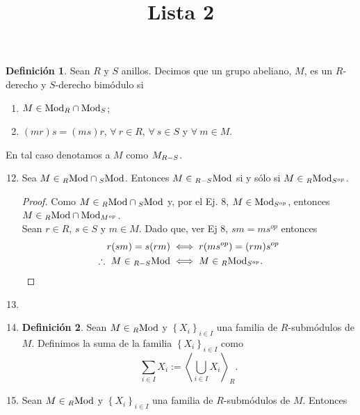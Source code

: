 \documentclass{article}
\title{Lista 2}
\author{}
\date{}
\newcommand{\arbtfam}[3]{
	{\left\{{#1}_{#2}\right\}}_{#2\in #3}
}
\newcommand{\gengroup}[1]{
	\left< #1\right>
}
\newcommand{\opst}[1]{
	{#1}^{op}
}
\newcommand{\ringmod}[3]{
	\if#3l
	{}_{#1}#2
	\else
	\if#3r
	#2_{#1}
	\fi
	\fi
}
\newcommand{\ringbimod}[4]{
	\if#4l
	{}_{#1-#2}#3
	\else
	\if#4r
	#3_{#1-#2}
	\else 
	\ifstrequal{#4}{lr}{
		{}_{#1}#3_{#2}
	}
	\fi
	\fi
}
\theoremstyle{definition}
\newtheorem{define}{Definición}
\theoremstyle{plain}
\theoremstyle{plain}
\theoremstyle{definition}
\theoremstyle{definition}
\theoremstyle{definition}
\theoremstyle{definition}
\theoremstyle{definition}
\theoremstyle{definition}
\begin{document}
	
	\maketitle
\begin{define}
	Sean $R$ y $S$ anillos. Decimos que un grupo abeliano, $M$, es un $R$-derecho y $S$-derecho bimódulo si
	\begin{enumerate}[label=\roman*)]
		\item $M\in\ringmod{R}{\text{Mod}}{r}\cap\ringmod{S}{\text{Mod}}{r}$;
		\item $(mr)s=(ms)r$, $\forall\ r\in R$, $\forall\ s\in S$ y $\forall\ m\in M$.
	\end{enumerate}
	En tal caso denotamos a $M$ como $\ringbimod{R}{S}{M}{r}$.
\end{define}
	\begin{enumerate}
		\setcounter{enumi}{11}
\item Sea $M\in\ringmod{R}{\text{Mod}}{l}\cap\ringmod{S}{\text{Mod}}{l}$. Entonces $M\in\ringbimod{R}{S}{\text{Mod}}{l}$ si y sólo si $M\in\ringbimod{R}{\opst{S}}{\text{Mod}}{lr}$.
\begin{proof}
	Como $M\in\ringmod{R}{\text{Mod}}{l}\cap\ringmod{S}{\text{Mod}}{l}$ y, por el Ej. 8, $M\in\ringmod{\opst{S}}{\text{Mod}}{r}$, entonces $M\in\ringmod{R}{\text{Mod}}{l}\cap\ringmod{\opst{M}}{\text{Mod}}{r}$.\\ Sean $r\in R$, $s\in S$ y $m\in M$. 
	Dado que, ver Ej 8, $sm=ms^{op}$ entonces 
	\begin{align*}
		r(sm)=s(rm)&\iff r(m\opst{s})=(rm)\opst{s}\\
		\therefore\  M\in\ringbimod{R}{S}{\text{Mod}}{l}&\iff M\in\ringbimod{R}{\opst{S}}{\text{Mod}}{lr}.
	\end{align*}
\end{proof}
\item\item
\begin{define}
	Sean $M\in\ringmod{R}{\text{Mod}}{l}$ y $\arbtfam{X}{i}{I}$ una familia de $R$-submódulos de $M$. Definimos la suma de la familia $\arbtfam{X}{i}{I}$ como
	\begin{equation*}
		\sum_{i\in I}X_i:=\gengroup{\bigcup_{i\in I}X_i}_R.
	\end{equation*}
\end{define}
\item Sean $M\in\ringmod{R}{\text{Mod}}{l}$ y $\arbtfam{X}{i}{I}$ una familia de $R$-submódulos de $M$. Entonces
\begin{enumerate}[label=(\alph*)]

\end{enumerate}
\end{enumerate}
\end{document}
